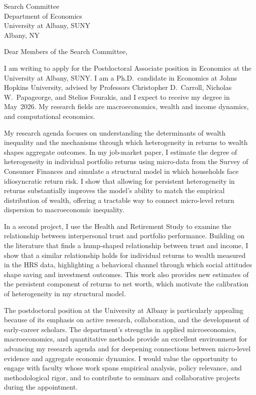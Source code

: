 \documentclass[11pt,letterpaper]{letter}
\begin{document}
\begin{letter}{Search Committee \\
Department of Economics \\
University at Albany, SUNY \\
Albany, NY}

\opening{Dear Members of the Search Committee,}

I am writing to apply for the Postdoctoral Associate position in Economics at the University at Albany, SUNY. I am a Ph.D.\ candidate in Economics at Johns Hopkins University, advised by Professors Christopher D.~Carroll, Nicholas W.~Papageorge, and Stelios Fourakis, and I expect to receive my degree in May~2026. My research fields are macroeconomics, wealth and income dynamics, and computational economics.

My research agenda focuses on understanding the determinants of wealth inequality and the mechanisms through which heterogeneity in returns to wealth shapes aggregate outcomes. In my job-market paper, I estimate the degree of heterogeneity in individual portfolio returns using micro-data from the Survey of Consumer Finances and simulate a structural model in which households face idiosyncratic return risk. I show that allowing for persistent heterogeneity in returns substantially improves the model’s ability to match the empirical distribution of wealth, offering a tractable way to connect micro-level return dispersion to macroeconomic inequality.

In a second project, I use the Health and Retirement Study to examine the relationship between interpersonal trust and portfolio performance. Building on the literature that finds a hump-shaped relationship between trust and income, I show that a similar relationship holds for individual returns to wealth measured in the HRS data, highlighting a behavioral channel through which social attitudes shape saving and investment outcomes. This work also provides new estimates of the persistent component of returns to net worth, which motivate the calibration of heterogeneity in my structural model.

The postdoctoral position at the University at Albany is particularly appealing because of its emphasis on active research, collaboration, and the development of early-career scholars. The department’s strengths in applied microeconomics, macroeconomics, and quantitative methods provide an excellent environment for advancing my research agenda and for deepening connections between micro-level evidence and aggregate economic dynamics. I would value the opportunity to engage with faculty whose work spans empirical analysis, policy relevance, and methodological rigor, and to contribute to seminars and collaborative projects during the appointment.


\end{letter}
\end{document}
